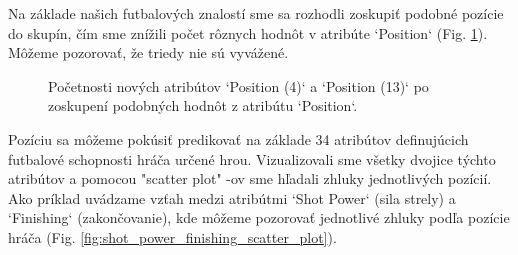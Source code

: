 \documentclass[runningheads]{llncs}
\begin{document}
Na základe našich futbalových znalostí sme sa rozhodli zoskupiť podobné pozície do skupín, čím sme znížili počet rôznych hodnôt v atribúte `Position` (Fig. \ref{fig:position_grouping}). Môžeme pozorovať, že triedy nie sú vyvážené.

\begin{figure}%
    \centering
    \qquad
    \caption{Početnosti nových atribútov `Position (4)` a `Position (13)` po zoskupení podobných hodnôt z atribútu `Position`.}%
    \label{fig:position_grouping}%
\end{figure}

Pozíciu sa môžeme pokúsiť predikovať na základe 34 atribútov definujúcich futbalové schopnosti hráča určené hrou. Vizualizovali sme všetky dvojice týchto atribútov a pomocou "scatter plot" -ov  sme hľadali zhluky jednotlivých pozícií. Ako príklad uvádzame vzťah medzi atribútmi `Shot Power` (sila strely) a `Finishing` (zakončovanie), kde môžeme pozorovať jednotlivé zhluky podľa pozície hráča (Fig. \ref{fig:shot_power_finishing_scatter_plot}).
\end{document}

